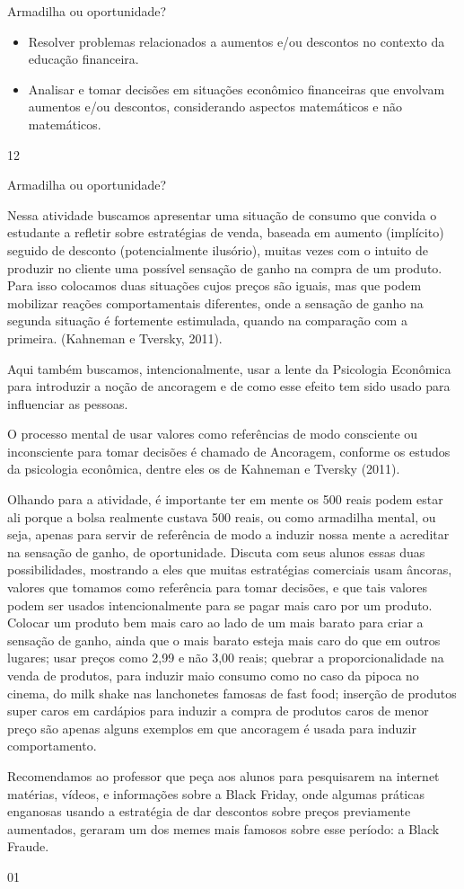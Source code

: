 \clearpage
\def\currentcolor{session2}
\begin{objectives}{Armadilha ou oportunidade?}
{
\begin{itemize}
\item Resolver problemas relacionados a aumentos e/ou descontos no contexto da educação financeira.
\item Analisar e tomar decisões em situações econômico financeiras que envolvam aumentos e/ou descontos, considerando aspectos matemáticos e não matemáticos.
\end{itemize}
}{1}{2}
\end{objectives}
\begin{sugestions}{Armadilha ou oportunidade?}
{
Nessa atividade buscamos apresentar uma situação de consumo que convida o estudante a refletir sobre estratégias de venda, baseada em aumento (implícito) seguido de desconto (potencialmente ilusório), muitas vezes com o intuito de produzir no cliente uma possível sensação de ganho na compra de um produto. Para isso colocamos duas situações cujos preços são iguais, mas que podem mobilizar reações comportamentais diferentes, onde a sensação de ganho na segunda situação é fortemente estimulada, quando na comparação com a primeira. (Kahneman e Tversky, 2011).

Aqui também buscamos, intencionalmente, usar a lente da Psicologia Econômica para introduzir a noção de ancoragem e de como esse efeito tem sido usado para influenciar as pessoas. 

O processo mental de usar valores como referências de modo consciente ou inconsciente para tomar decisões é chamado de Ancoragem, conforme os estudos da psicologia econômica, dentre eles os de Kahneman e Tversky (2011).

Olhando para a atividade, é importante ter em mente os 500 reais podem estar ali porque a bolsa realmente custava 500 reais, ou como armadilha mental, ou seja, apenas para servir de referência de modo a induzir nossa mente a acreditar na sensação de ganho, de oportunidade. 
Discuta com seus alunos essas duas possibilidades, mostrando a eles que muitas estratégias comerciais usam âncoras, valores que tomamos como referência para tomar decisões, e que tais valores podem ser usados intencionalmente para se pagar mais caro por um produto. Colocar um produto bem mais caro ao lado de um mais barato para criar a sensação de ganho, ainda que o mais barato esteja mais caro do que em outros lugares; usar preços como 2,99 e não 3,00 reais; quebrar a proporcionalidade na venda de produtos, para induzir maio consumo como no caso da pipoca no cinema, do milk shake nas lanchonetes famosas de fast food; inserção de produtos super caros em cardápios para induzir a compra de produtos caros de menor preço são apenas alguns exemplos em que ancoragem é usada para induzir comportamento. 

Recomendamos ao professor que peça aos alunos para pesquisarem na internet matérias, vídeos, e informações sobre a Black Friday, onde algumas práticas enganosas usando a estratégia de dar descontos sobre preços previamente aumentados, geraram um dos memes mais famosos sobre esse período: a Black Fraude. 

}{0}{1}
\end{sugestions}
